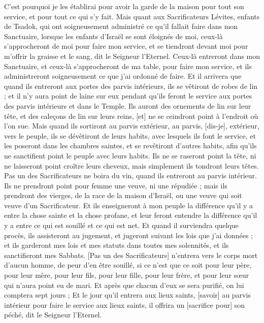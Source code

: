 \begin{multicols}{2}
C'est pourquoi je les établirai pour avoir la garde de la maison pour tout son service, et pour tout ce qui s'y fait.
Mais quant aux Sacrificateurs Lévites, enfants de Tsadok, qui ont soigneusement administré ce qu'il fallait faire dans mon Sanctuaire, lorsque les enfants d'Israël se sont éloignés de moi, ceux-là s'approcheront de moi pour faire mon service, et se tiendront devant moi pour m'offrir la graisse et le sang, dit le Seigneur l'Eternel.
Ceux-là entreront dans mon Sanctuaire, et ceux-là s'approcheront de ma table, pour faire mon service, et ils administreront soigneusement ce que j'ai ordonné de faire.
Et il arrivera que quand ils entreront aux portes des parvis intérieurs, ils se vêtiront de robes de lin ; et il n'y aura point de laine sur eux pendant qu'ils feront le service aux portes des parvis intérieurs et dans le Temple.
Ils auront des ornements de lin sur leur tête, et des caleçons de lin sur leurs reins, [et] ne se ceindront point à l'endroit où l'on sue.
Mais quand ils sortiront au parvis extérieur, au parvis, [dis-je], extérieur, vers le peuple, ils se dévêtiront de leurs habits, avec lesquels ils font le service, et les poseront dans les chambres saintes, et se revêtiront d'autres habits, afin qu'ils ne sanctifient point le peuple avec leurs habits.
Ils ne se raseront point la tête, ni ne laisseront point croître leurs cheveux, mais simplement ils tondront leurs têtes.
Pas un des Sacrificateurs ne boira du vin, quand ils entreront au parvis intérieur.
Ils ne prendront point pour femme une veuve, ni une répudiée ; mais ils prendront des vierges, de la race de la maison d'Israël, ou une veuve qui soit veuve d'un Sacrificateur.
Et ils enseigneront à mon peuple la différence qu'il y a entre la chose sainte et la chose profane, et leur feront entendre la différence qu'il y a entre ce qui est souillé et ce qui est net.
Et quand il surviendra quelque procès, ils assisteront au jugement, et jugeront suivant les lois que j'ai données ; et ils garderont mes lois et mes statuts dans toutes mes solennités, et ils sanctifieront mes Sabbats.
[Pas un des Sacrificateurs] n'entrera vers le corps mort d'aucun homme, de peur d'en être souillé, si ce n'est que ce soit pour leur père, pour leur mère, pour leur fils, pour leur fille, pour leur frère, et pour leur sœur qui n'aura point eu de mari.
Et après que chacun d'eux se sera purifié, on lui comptera sept jours ;
Et le jour qu'il entrera aux lieux saints, [savoir] au parvis intérieur pour faire le service aux lieux saints, il offrira un [sacrifice pour] son péché, dit le Seigneur l'Eternel.

\end{multicols}
